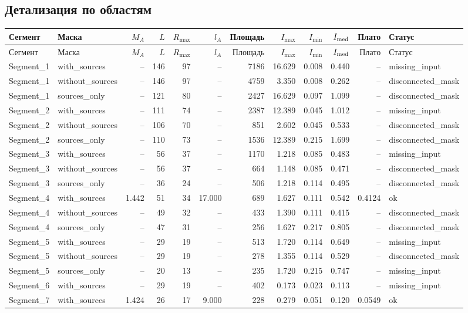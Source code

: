 \documentclass[10pt,a4paper]{article}
\begin{document}
\subsection*{Детализация по областям}
\scriptsize
\setlength{\tabcolsep}{2.7pt}
\begin{longtable}{llrrrrrrrrrl}
\toprule
Сегмент & Маска & $M_A$ & $L$ & $R_{\max}$ & $l_A$ & Площадь & $I_{\max}$ & $I_{\min}$ & $I_{\rm med}$ & Плато & Статус \\
\midrule\endfirsthead
\toprule
Сегмент & Маска & $M_A$ & $L$ & $R_{\max}$ & $l_A$ & Площадь & $I_{\max}$ & $I_{\min}$ & $I_{\rm med}$ & Плато & Статус \\
\midrule\endhead
Segment\_1 & with\_sources & -- & 146 & 97 & -- & 7186 & 16.629 & 0.008 & 0.440 & -- & missing\_input \\
Segment\_1 & without\_sources & -- & 146 & 97 & -- & 4759 & 3.350 & 0.008 & 0.262 & -- & disconnected\_mask \\
Segment\_1 & sources\_only & -- & 121 & 80 & -- & 2427 & 16.629 & 0.097 & 1.099 & -- & disconnected\_mask \\
Segment\_2 & with\_sources & -- & 111 & 74 & -- & 2387 & 12.389 & 0.045 & 1.012 & -- & missing\_input \\
Segment\_2 & without\_sources & -- & 106 & 70 & -- & 851 & 2.602 & 0.045 & 0.533 & -- & disconnected\_mask \\
Segment\_2 & sources\_only & -- & 110 & 73 & -- & 1536 & 12.389 & 0.215 & 1.699 & -- & disconnected\_mask \\
Segment\_3 & with\_sources & -- & 56 & 37 & -- & 1170 & 1.218 & 0.085 & 0.483 & -- & missing\_input \\
Segment\_3 & without\_sources & -- & 56 & 37 & -- & 664 & 1.148 & 0.085 & 0.471 & -- & disconnected\_mask \\
Segment\_3 & sources\_only & -- & 36 & 24 & -- & 506 & 1.218 & 0.114 & 0.495 & -- & disconnected\_mask \\
Segment\_4 & with\_sources & 1.442 & 51 & 34 & 17.000 & 689 & 1.627 & 0.111 & 0.542 & 0.4124 & ok \\
Segment\_4 & without\_sources & -- & 49 & 32 & -- & 433 & 1.390 & 0.111 & 0.415 & -- & disconnected\_mask \\
Segment\_4 & sources\_only & -- & 47 & 31 & -- & 256 & 1.627 & 0.217 & 0.805 & -- & disconnected\_mask \\
Segment\_5 & with\_sources & -- & 29 & 19 & -- & 513 & 1.720 & 0.114 & 0.649 & -- & missing\_input \\
Segment\_5 & without\_sources & -- & 29 & 19 & -- & 278 & 1.355 & 0.114 & 0.529 & -- & disconnected\_mask \\
Segment\_5 & sources\_only & -- & 20 & 13 & -- & 235 & 1.720 & 0.215 & 0.747 & -- & missing\_input \\
Segment\_6 & with\_sources & -- & 29 & 19 & -- & 402 & 0.173 & 0.023 & 0.113 & -- & missing\_input \\
Segment\_7 & with\_sources & 1.424 & 26 & 17 & 9.000 & 228 & 0.279 & 0.051 & 0.120 & 0.0549 & ok \\
\bottomrule
\end{longtable}
\normalsize
\clearpage
\end{document}
